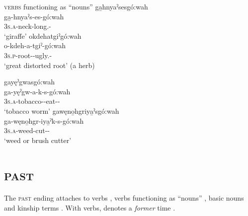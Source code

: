 \ea\label{ex:gowex2} \textsc{verbs} functioning as “nouns”
\ea ga̱hnyaˀsesgó:wah\\
\gll ga̱-hnyaˀs-es-gó:wah\\
 \textsc{3s.a}-neck-long.{\stative}-{\augmentative}\\
\glt `giraffe'
\ex okdehatgiˀgó:wah\\
\gll o-kdeh-a-tgiˀ-gó:wah \\
\textsc{3s.p}-root-{\joinerA}-ugly.{\stative}-{\augmentative}\\
\glt ‘great distorted root’ (a herb)

\ex gayęˀgwasgó:wah\\
\gll ga-yęˀgw-a-k-s-gó:wah\\
 \textsc{3s.a}-tobacco-{\joinerA}-eat-{\habitual}-{\augmentative}\\
\glt `tobacco worm'
\ex gawęno̱hgriya̱ˀsgó:wah\\
\gll ga-węno̱hgr-iya̱ˀk-s-gó:wah\\
 \textsc{3s.a}-weed-cut-{\habitual}-{\augmentative}\\
\glt `weed or brush cutter'
\z
\z

\section{ \textsc{past}} \label{-gęhę:ˀ}
The  \textsc{past} ending attaches to verbs , verbs functioning as “nouns” , basic nouns  and kinship terms . With verbs,  denotes a \emph{former} time .

